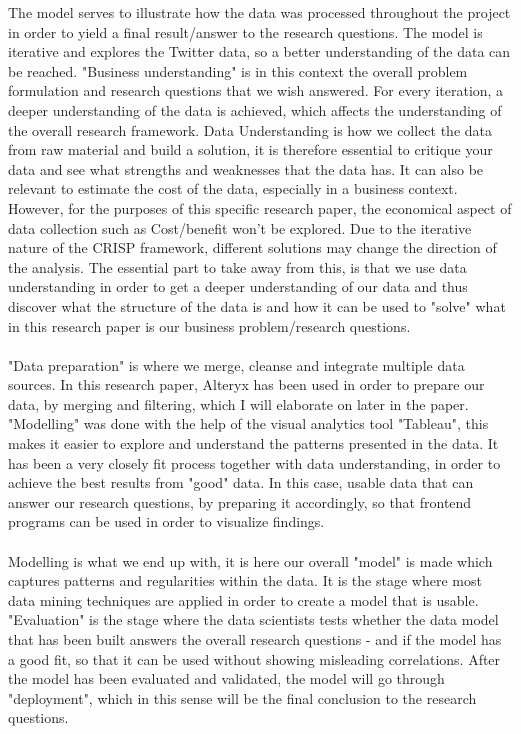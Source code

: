 \documentclass[12pt]{article}
\begin{document}
The model serves to illustrate how the data was processed throughout the project in order to yield a final result/answer to the research questions. The model is iterative and explores the Twitter data, so a better understanding of the data can be reached. "Business understanding" is in this context the overall problem formulation and research questions that we wish answered. For every iteration, a deeper understanding of the data is achieved, which affects the understanding of the overall research framework.
Data Understanding is how we collect the data from raw material and build a solution, it is therefore essential to critique your data and see what strengths and weaknesses that the data has. It can also be relevant to estimate the cost of the data, especially in a business context. However, for the purposes of this specific research paper, the economical aspect of data collection such as Cost/benefit won't be explored. Due to the iterative nature of the CRISP framework, different solutions may change the direction of the analysis. The essential part to take away from this, is that we use data understanding in order to get a deeper understanding of our data and thus discover what the structure of the data is and how it can be used to "solve" what in this research paper is our business problem/research questions. \\ \\
"Data preparation" is where we merge, cleanse and integrate multiple data sources. In this research paper, Alteryx has been used in order to prepare our data, by merging and filtering, which I will elaborate on later in the paper. \\


"Modelling" was done with the help of the visual analytics tool  "Tableau", this makes it easier to explore and understand the patterns presented in the data. It has been a very closely fit process together with data understanding, in order to achieve the best results from "good" data. In this case, usable data that can answer our research questions, by  preparing it accordingly, so that frontend programs can be used in order to visualize findings. \\ \\ Modelling is what we end up with, it is here our overall "model" is made which captures patterns and regularities within the data. It is the stage where most data mining techniques are applied in order to create a model that is usable.\\

 "Evaluation"  is the stage where the data scientists tests whether the data model that has been built answers the overall research questions - and if the model has a good fit, so that it can be used without showing misleading correlations. After the model has been evaluated and validated, the model will go through "deployment", which in this sense will be the final conclusion to
the research questions.\\
\end{document}
